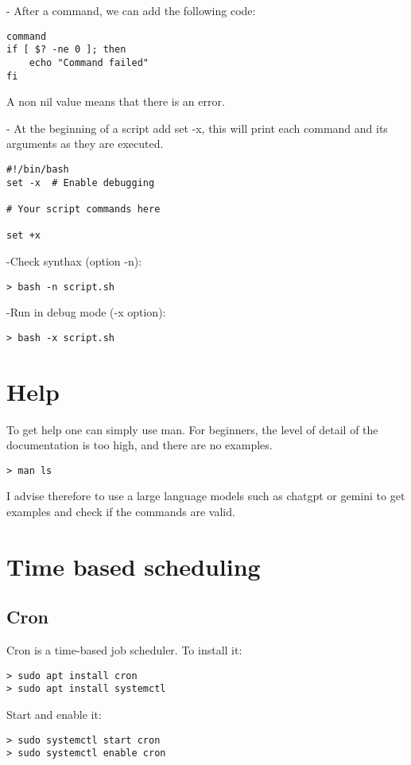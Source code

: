 \documentclass[24pt]{article}
\begin{document}
- After a command, we can add the following code:
\begin{lstlisting}
command
if [ $? -ne 0 ]; then
    echo "Command failed"
fi
\end{lstlisting}
A non nil value means that there is an error.

- At the beginning of a script add set -x, this will print each command and its arguments as they are executed. 
\begin{lstlisting}
#!/bin/bash
set -x  # Enable debugging

# Your script commands here

set +x
\end{lstlisting}

-Check synthax (option -n):
\begin{lstlisting}
> bash -n script.sh
\end{lstlisting}

-Run in debug mode (-x option):
\begin{lstlisting}
> bash -x script.sh
\end{lstlisting}

\section{Help}
To get help one can simply use man. For beginners, the level of detail of the documentation is too high, and there are no examples.
\begin{lstlisting}
> man ls
\end{lstlisting}

I advise therefore to use a large language models such as chatgpt or gemini to get examples and check if the commands are valid.
 

\section{Time based scheduling}
  
\subsection{Cron}

Cron is a time-based job scheduler. To install it:
\begin{lstlisting}
> sudo apt install cron
> sudo apt install systemctl
\end{lstlisting}

Start and enable it: 

\begin{lstlisting}
> sudo systemctl start cron
> sudo systemctl enable cron
\end{lstlisting}
\end{document}
